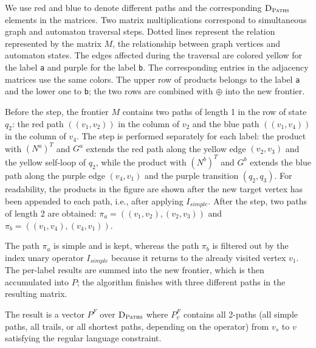 We use \textcolor{MyRedDark}{red} and \textcolor{MyBlueDark}{blue} to denote different paths and the corresponding $\textsc{D}_{\textsc{Paths}}$ elements in the matrices. Two matrix multiplications correspond to simultaneous graph and automaton traversal steps.
Dotted lines represent the relation represented by the matrix $M$, the relationship between graph vertices and automaton states.
The edges affected during the traversal are colored \textcolor{MyYellowDark}{yellow} for the label \texttt{a} and \textcolor{MyPurple}{purple} for the label \texttt{b}.
The corresponding entries in the adjacency matrices use the same colors.
The upper row of products belongs to the label \texttt{a} and the lower one to \texttt{b}; the two rows are combined with $\oplus$ into the new frontier.

Before the step, the frontier $M$ contains two paths of length 1 in the row of state $q_2$: the \textcolor{MyRedDark}{red} path $((v_1, v_2))$ in the column of $v_2$ and the \textcolor{MyBlueDark}{blue} path $((v_1, v_4))$ in the column of $v_4$.
The step is performed separately for each label: the product with $(N^a)^T$ and $G^a$ extends the \textcolor{MyRedDark}{red} path along the \textcolor{MyYellowDark}{yellow} edge $(v_2, v_3)$ and the \textcolor{MyYellowDark}{yellow} self-loop of $q_2$, while the product with $(N^b)^T$ and $G^b$ extends the \textcolor{MyBlueDark}{blue} path along the \textcolor{MyPurple}{purple} edge $(v_4, v_1)$ and the \textcolor{MyPurple}{purple} transition $(q_2, q_3)$.
For readability, the products in the figure are shown after the new target vertex has been appended to each path, i.e., after applying $I_{simple}$.
After the step, two paths of length 2 are obtained:
$\pi_a = ((v_1, v_2), (v_2, v_3))$ and
$\pi_b = ((v_1, v_4), (v_4, v_1))$.

The path $\pi_a$ is simple and is kept, whereas the path $\pi_b$ is filtered out by the index unary operator $I_{simple}$ because it returns to the already visited vertex $v_1$.
The per-label results are summed into the new frontier, which is then accumulated into $P$; the algorithm finishes with three different paths in the resulting matrix.

The result is a vector $P^F$ over $\textsc{D}_{\textsc{Paths}}$ where $P^F_v$ contains all 2-paths (all simple paths, all trails, or all shortest paths, depending on the operator) from $v_s$ to $v$ satisfying the regular language constraint.


